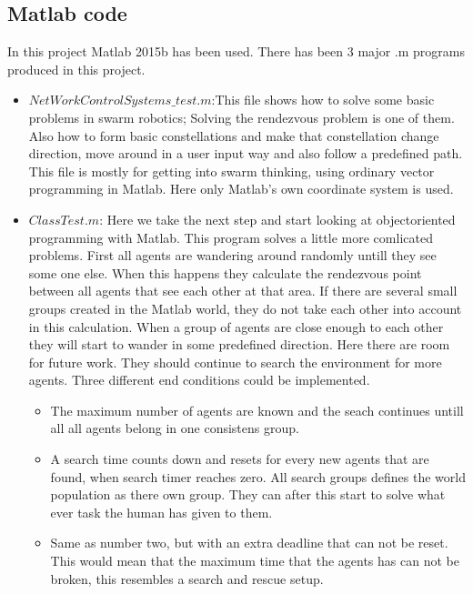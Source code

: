 \subsection{Matlab code}
In this project Matlab 2015b has been used.
There has been 3 major .m programs produced in this project. 
\begin{itemize}
\item $NetWorkControlSystems\_test.m$:This file shows how to solve some basic problems in swarm robotics; Solving the rendezvous problem is one of them. Also how to form basic constellations and make that constellation change direction, move around in a user input way and also follow a predefined path. This file is mostly for getting into swarm thinking, using ordinary vector programming in Matlab. Here only Matlab's own coordinate system is used.

\item $ClassTest.m$: Here we take the next step and start looking at objectoriented programming with Matlab. This program solves a little more comlicated problems. First all agents are wandering around randomly untill they see some one else. When this happens they calculate the rendezvous point between all agents that see each other at that area. If there are several small groups created in the Matlab world, they do not take each other into account in this calculation. When a group of agents are close enough to each other they will start to wander in some predefined direction. Here there are room for future work. They should continue to search the environment for more agents. Three different end conditions could be implemented.
\begin{itemize}
\item The maximum number of agents are known and the seach continues untill all all agents belong in one consistens group.

\item A search time counts down and resets for every new agents that are found, when search timer reaches zero. All search groups defines the world population as there own group. They can after this start to solve what ever task the human has given to them.
\item Same as number two, but with an extra deadline that can not be reset. This would mean that the maximum time that the agents has can not be broken, this resembles a search and rescue setup.
\end{itemize}


\end{itemize}
